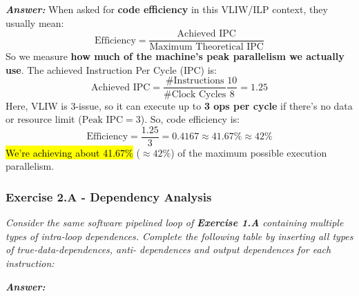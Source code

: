\begin{enumerate}
    \textcolor{Green3}{\textbf{\emph{Answer:}}} When asked for \textbf{code efficiency} in this VLIW/ILP context, they usually mean:
    \begin{equation*}
        \text{Efficiency} = \frac{\text{Achieved IPC}}{\text{Maximum Theoretical IPC}}
    \end{equation*}
    So we measure \textbf{how much of the machine's peak parallelism we actually use}. The achieved Instruction Per Cycle (IPC) is:
    \begin{equation*}
        \text{Achieved IPC} = \dfrac{\text{\# Instructions}}{\text{\# Clock Cycles}} \dfrac{10}{8} = 1.25
    \end{equation*}
    Here, VLIW is 3-issue, so it can execute up to \textbf{3 ops per cycle} if there's no data or resource limit ($\text{Peak IPC} = 3$). So, code efficiency is:
    \begin{equation*}
        \text{Efficiency} = \frac{1.25}{3} = 0.4167 \approx 41.67\% \approx 42\%
    \end{equation*}
    \hl{We're achieving about 41.67\%} ($\approx 42 \%$) of the maximum possible execution parallelism.
\end{enumerate}

\newpage

\subsubsection*{Exercise 2.A - Dependency Analysis}

\emph{Consider the same software pipelined loop of \textbf{Exercise 1.A} containing multiple types of intra-loop dependences. Complete the following table by inserting all types of true-data-dependences, anti-
dependences and output dependences for each instruction:}

\highspace
\textcolor{Green3}{\textbf{\emph{Answer:}}}

